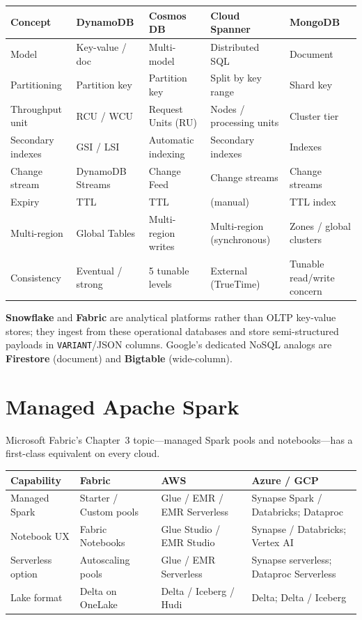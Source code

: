 \begin{center}
\footnotesize
\begin{tabular}{@{}p{2.8cm}p{2.9cm}p{2.9cm}p{2.9cm}p{2.4cm}@{}}
\toprule
\textbf{Concept} & \textbf{DynamoDB} & \textbf{Cosmos DB} & \textbf{Cloud Spanner} & \textbf{MongoDB} \\
\midrule
Model & Key-value / doc & Multi-model & Distributed SQL & Document \\
Partitioning & Partition key & Partition key & Split by key range & Shard key \\
Throughput unit & RCU / WCU & Request Units (RU) & Nodes / processing units & Cluster tier \\
Secondary indexes & GSI / LSI & Automatic indexing & Secondary indexes & Indexes \\
Change stream & DynamoDB Streams & Change Feed & Change streams & Change streams \\
Expiry & TTL & TTL & (manual) & TTL index \\
Multi-region & Global Tables & Multi-region writes & Multi-region (synchronous) & Zones / global clusters \\
Consistency & Eventual / strong & 5 tunable levels & External (TrueTime) & Tunable read/write concern \\
\bottomrule
\end{tabular}
\end{center}

\noindent \textbf{Snowflake} and \textbf{Fabric} are analytical platforms rather than OLTP key-value
stores; they ingest from these operational databases and store semi-structured payloads in
\texttt{VARIANT}/JSON columns. Google's dedicated NoSQL analogs are \textbf{Firestore} (document)
and \textbf{Bigtable} (wide-column).

\section{Managed Apache Spark}
%
Microsoft Fabric's Chapter~3 topic---managed Spark pools and notebooks---has a first-class
equivalent on every cloud.

\begin{center}
\footnotesize
\begin{tabular}{@{}p{2.8cm}p{3.2cm}p{3.2cm}p{3.2cm}@{}}
\toprule
\textbf{Capability} & \textbf{Fabric} & \textbf{AWS} & \textbf{Azure / GCP} \\
\midrule
Managed Spark & Starter / Custom pools & Glue / EMR / EMR Serverless & Synapse Spark / Databricks; Dataproc \\
Notebook UX & Fabric Notebooks & Glue Studio / EMR Studio & Synapse / Databricks; Vertex AI \\
Serverless option & Autoscaling pools & Glue / EMR Serverless & Synapse serverless; Dataproc Serverless \\
Lake format & Delta on OneLake & Delta / Iceberg / Hudi & Delta; Delta / Iceberg \\
\bottomrule
\end{tabular}
\end{center}

